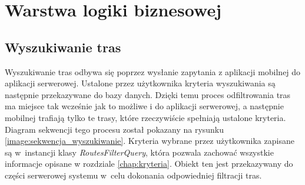 \section{Warstwa logiki biznesowej}
\subsection{Wyszukiwanie tras}
Wyszukiwanie tras odbywa się poprzez wysłanie zapytania z aplikacji mobilnej do aplikacji serwerowej. Ustalone przez użytkownika kryteria wyszukiwania są następnie przekazywane do bazy danych. Dzięki temu proces odfiltrowania tras ma miejsce tak wcześnie jak to możliwe i do aplikacji serwerowej, a następnie mobilnej trafiają tylko te trasy, które rzeczywiście spełniają ustalone kryteria. Diagram sekwencji tego procesu został pokazany na rysunku \ref{image:sekwencja_wyszukiwanie}. Kryteria wybrane przez użytkownika zapisane są w~instancji klasy \textit{RoutesFilterQuery}, która pozwala zachować wszystkie informacje opisane w rozdziale \ref{chap:kryteria}. Obiekt ten jest przekazywany do części serwerowej systemu w~celu dokonania odpowiedniej filtracji tras.

